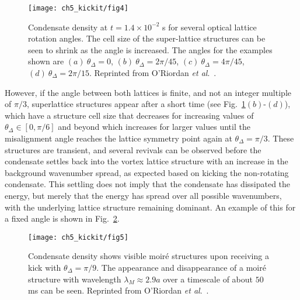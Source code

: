 	\begin{figure}
        \centering
			\texttt{[image: ch5\_kickit/fig4]}
			\caption[Effect of kicking on condensate with a large vortex lattice.]{Condensate density at $t=1.4\times10^{-2}$ s for several optical lattice rotation angles. The cell size of the super-lattice structures can be seen to shrink as the angle is increased. The angles for the examples shown are $(a)~\theta_\Delta=0$, $(b)~\theta_\Delta=2\pi/45$, $(c)~\theta_\Delta=4\pi/45$, $(d)~\theta_\Delta=2\pi/15$. Reprinted from O'Riordan {\textit{et al}.}~\cite{VTX:oriordan_pra_2016}.}
			\label{fig:moire_density}
		\end{figure}

    However, if the angle between both lattices is finite, and not an integer multiple of $\pi/3$, superlattice structures appear after a short time (see Fig.~\ref{fig:moire_density}$(b)$-$(d)$), which have a structure cell size that decreases for increasing values of $\theta_\Delta\in[0,\pi/6]$ and beyond which increases for larger values until the misalignment angle reaches the lattice symmetry point again at $\theta_\Delta=\pi/3$. These structures are transient, and several revivals can be observed before the condensate settles back into the vortex lattice structure with an increase in the background wavenumber spread, as expected based on kicking the non-rotating condensate. This settling does not imply that the condensate has dissipated the energy, but merely that the energy has spread over all possible wavenumbers, with the underlying lattice structure remaining dominant. An example of this for a fixed angle is shown in Fig.~\ref{fig:dtheta20_ev}.

	\begin{figure}
        \centering
		\texttt{[image: ch5\_kickit/fig5]}
		\caption[Oscillation of moir\'e wavelength.]{Condensate density shows visible moir\'e structures upon receiving a kick with $\theta_\Delta=\pi/9$. The appearance and disappearance of a moir\'e structure with wavelength $\lambda_M \approx 2.9 a$ over a timescale of about $50$ ms can be seen. Reprinted from O'Riordan {\textit{et al}.}~\cite{VTX:oriordan_pra_2016}.}
		\label{fig:dtheta20_ev}
	\end{figure}

